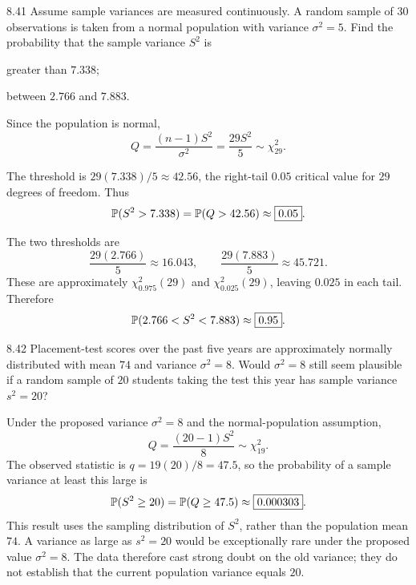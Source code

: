 \documentclass[11pt,oneside]{article}
\begin{document}
\begin{exercise}{8.41}
Assume sample variances are measured continuously. A random sample of $30$ observations is taken from a normal population with variance $\sigma^2=5$. Find the probability that the sample variance $S^2$ is
\begin{exercisesubparts}
\item greater than $7.338$;
\item between $2.766$ and $7.883$.
\end{exercisesubparts}
\end{exercise}
\begin{solution}
Since the population is normal,
\[
Q=\frac{(n-1)S^2}{\sigma^2}=\frac{29S^2}{5}\sim\chi^2_{29}.
\]
\begin{exercisesubparts}
\item The threshold is $29(7.338)/5\approx42.56$, the right-tail $0.05$ critical value for $29$ degrees of freedom. Thus
\[
\mathbb{P}(S^2>7.338)=\mathbb{P}(Q>42.56)\approx\boxed{0.05}.
\]
\item The two thresholds are
\[
\frac{29(2.766)}5\approx16.043, \qquad
\frac{29(7.883)}5\approx45.721.
\]
These are approximately $\chi^2_{0.975}(29)$ and $\chi^2_{0.025}(29)$, leaving $0.025$ in each tail. Therefore
\[
\mathbb{P}(2.766<S^2<7.883)\approx\boxed{0.95}.
\]
\end{exercisesubparts}
\end{solution}

\begin{exercise}{8.42}
Placement-test scores over the past five years are approximately normally distributed with mean $74$ and variance $\sigma^2=8$. Would $\sigma^2=8$ still seem plausible if a random sample of $20$ students taking the test this year has sample variance $s^2=20$?
\end{exercise}
\begin{solution}
Under the proposed variance $\sigma^2=8$ and the normal-population assumption,
\[
Q=\frac{(20-1)S^2}{8}\sim\chi^2_{19}.
\]
The observed statistic is $q=19(20)/8=47.5$, so the probability of a sample variance at least this large is
\[
\mathbb{P}(S^2\ge20)=\mathbb{P}(Q\ge47.5)\approx\boxed{0.000303}.
\]
This result uses the sampling distribution of $S^2$, rather than the population mean $74$. A variance as large as $s^2=20$ would be exceptionally rare under the proposed value $\sigma^2=8$. The data therefore cast strong doubt on the old variance; they do not establish that the current population variance equals $20$.
\end{solution}
\end{document}
